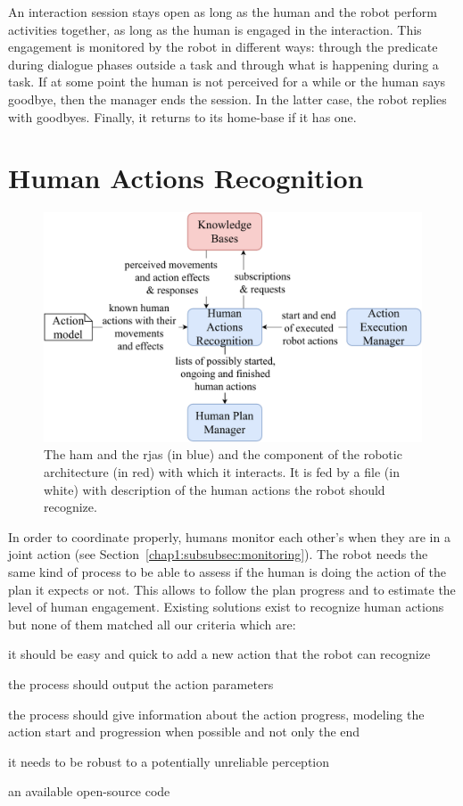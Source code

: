 \documentclass[a4paper,11pt,twoside]{StyleThese}
\begin{document}
An interaction session stays open as long as the human and the robot perform activities together, \ie as long as the human is engaged in the interaction. This engagement is monitored by the robot in different ways: through the predicate  during dialogue phases outside a task and through what is happening during a task. If at some point the human is not perceived for a while or the human says goodbye, then the manager ends the session. In the latter case, the robot replies with goodbyes. Finally, it returns to its home-base if it has one.

\section{Human Actions Recognition}\label{chap6:sec:h_moni}
\begin{figure}[!hbt]
	\centering
	\includegraphics[width=0.8\linewidth]{figures/chapter2/action_reco_zoom.pdf}
	\caption{The \acrlong{ham} and the \acrshort{rja}s (in blue) and the component of the robotic architecture (in red) with which it interacts. It is fed by a file (in white) with description of the human actions the robot should recognize.}
	\label{chap6:fig:action_monitoring_zoom}
\end{figure}

In order to coordinate properly, humans monitor each other's when they are in a joint action (see Section~\ref{chap1:subsubsec:monitoring}). The robot needs the same kind of process to be able to assess if the human is doing the action of the plan it expects or not. This allows to follow the plan progress and to estimate the level of human engagement. Existing solutions exist to recognize human actions but none of them matched all our criteria which are: 
\begin{bulletList}
	\item it should be easy and quick to add a new action that the robot can recognize
	\item the process should output the action parameters
	\item the process should give information about the action progress, \ie modeling the action start and progression when possible and not only the end
	\item it needs to be robust to a potentially unreliable perception
	\item an available open-source code 
\end{bulletList}
\end{document}
